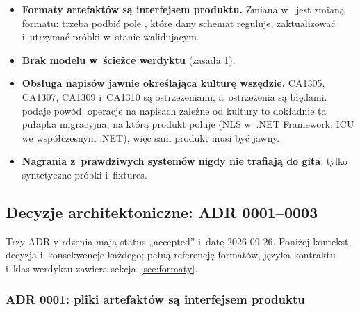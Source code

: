 \begin{itemize}
  \item \textbf{Formaty artefaktów są interfejsem produktu.} Zmiana w~ jest zmianą formatu: trzeba podbić pole , które
        dany schemat reguluje, zaktualizować  i~utrzymać próbki w~stanie
        walidującym.
  \item \textbf{Brak modelu w~ścieżce werdyktu} (zasada 1).
  \item \textbf{Obsługa napisów jawnie określająca kulturę wszędzie.} CA1305, CA1307,
        CA1309 i~CA1310 są ostrzeżeniami, a~ostrzeżenia są błędami. 
        podaje powód: operacje na napisach zależne od kultury to dokładnie ta pułapka
        migracyjna, na którą produkt poluje (NLS w~.NET Framework, ICU we współczesnym
        .NET), więc sam produkt musi być jawny.
  \item \textbf{Nagrania z~prawdziwych systemów nigdy nie trafiają do gita}; tylko
        syntetyczne próbki i~fixtures.
\end{itemize}


\subsection{Decyzje architektoniczne: ADR 0001–0003}\label{sec:rdzen-adr}

Trzy ADR-y rdzenia mają status „accepted” i~datę 2026-09-26. Poniżej kontekst, decyzja i~konsekwencje każdego; pełną referencję formatów, języka kontraktu i~klas werdyktu zawiera
sekcja~\ref{sec:formaty}.

\subsubsection{ADR 0001: pliki artefaktów są interfejsem produktu}

